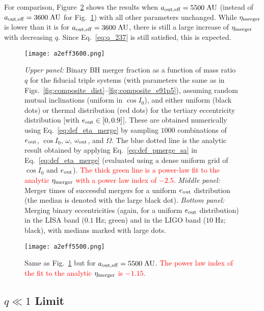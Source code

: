 \documentclass[
        fleqn,
        usenatbib,
    ]{mnras}
\begin{document}
For comparison, Figure~\ref{fig:popsynth5500} shows the results when
$a_{\rm out, eff} = 5500\;\mathrm{AU}$ (instead of $a_{\rm out, eff} =
3600\;\mathrm{AU}$ for Fig.~\ref{fig:popsynth}) with all other parameters
unchanged. While $\eta_{\rm merger}$ is lower than it is for $a_{\rm out, eff} =
3600\;\mathrm{AU}$, there is still a large increase of $\eta_{\rm merger}$ with
decreasing $q$. Since Eq.~\eqref{eq:q_237} is still satisfied, this is expected.
\begin{figure}
    \centering
    \texttt{[image: a2eff3600.png]}
    \caption{\emph{Upper panel:} Binary BH merger fraction as a function of mass
    ratio $q$ for the fiducial triple systems (with parameters the same as in
    Figs.~\ref{fig:composite_dist}--\ref{fig:composite_e91p5}), assuming random
    mutual inclinations (uniform in $\cos I_0$), and either uniform (black dots)
    or thermal distribution (red dots) for the tertiary eccentricity
    distribution [with $e_{\rm out} \in [0,0.9]$]. These are obtained
    numerically using Eq.~\eqref{eq:def_eta_merge} by sampling $1000$
    combinations of $e_{\rm out}$, $\cos I_0$, $\omega$, $\omega_{\rm out}$, and
    $\Omega$. The blue dotted line is the analytic result obtained by applying
    Eq.~\eqref{eq:def_pmerge_sa} in Eq.~\eqref{eq:def_eta_merge} (evaluated
    using a dense uniform grid of $\cos I_0$ and $e_{\rm out}$).
    \textcolor{red}{The thick green line is a power-law fit to the analytic
    $\eta_{\rm merger}$ with a power law index of $-2.5$.} \emph{Middle panel:}
    Merger times of successful mergers for a uniform $e_{\rm out}$ distribution
    (the median is denoted with the large black dot). \emph{Bottom panel:}
    Merging binary eccentricities (again, for a uniform $e_{\rm out}$
    distribution) in the LISA band ($0.1\;\mathrm{Hz}$; green) and in the LIGO
    band ($10 \;\mathrm{Hz}$; black), with medians marked with large dots.
    }\label{fig:popsynth}
\end{figure}
\begin{figure}
    \centering
    \texttt{[image: a2eff5500.png]}
    \caption{Same as Fig.~\ref{fig:popsynth} but for $a_{\rm out, eff} =
    5500\;\mathrm{AU}$. \textcolor{red}{The power law index of the fit to the
    analytic $\eta_{\rm merger}$ is $-1.15$.} }\label{fig:popsynth5500}
\end{figure}

\subsection{$q \ll 1$ Limit}
\end{document}
